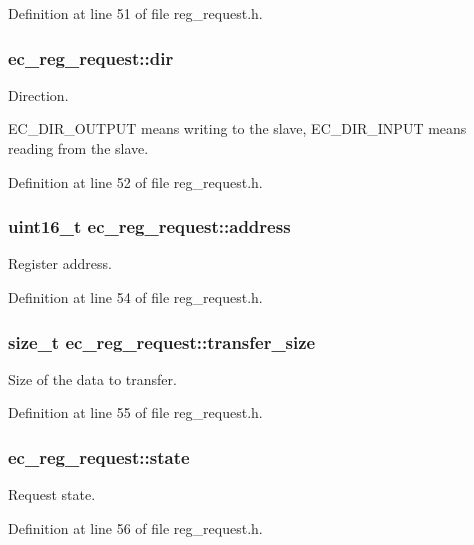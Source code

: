Definition at line 51 of file reg\-\_\-request.\-h.

\subsubsection[{dir}]{ ec\-\_\-reg\-\_\-request\-::dir}\label{structec__reg__request_ac9e44c1d65dd892c66d1a4f2a4427e48}


Direction. 

E\-C\-\_\-\-D\-I\-R\-\_\-\-O\-U\-T\-P\-U\-T means writing to the slave, E\-C\-\_\-\-D\-I\-R\-\_\-\-I\-N\-P\-U\-T means reading from the slave. 

Definition at line 52 of file reg\-\_\-request.\-h.

\subsubsection[{address}]{\setlength{\rightskip}{0pt plus 5cm}uint16\-\_\-t ec\-\_\-reg\-\_\-request\-::address}\label{structec__reg__request_aa6f44f4a9851e291726cbc92f7c099fa}


Register address. 



Definition at line 54 of file reg\-\_\-request.\-h.

\subsubsection[{transfer\-\_\-size}]{\setlength{\rightskip}{0pt plus 5cm}size\-\_\-t ec\-\_\-reg\-\_\-request\-::transfer\-\_\-size}\label{structec__reg__request_ae8a1e21e4dfa24c3c0878649f33f4de9}


Size of the data to transfer. 



Definition at line 55 of file reg\-\_\-request.\-h.

\subsubsection[{state}]{ ec\-\_\-reg\-\_\-request\-::state}\label{structec__reg__request_adfba6eddfd79740eae02362347093120}


Request state. 



Definition at line 56 of file reg\-\_\-request.\-h.

